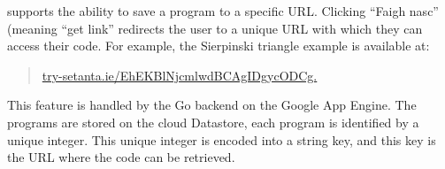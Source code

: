 \trys{} supports the ability to save a program to a specific URL. Clicking ``Faigh nasc'' (meaning ``get link'' redirects the user to a unique URL with which they can access their code. For example, the Sierpinski triangle example is available at:
\begin{quote}
    \href{https://try-setanta.ie/EhEKBlNjcmlwdBCAgIDgycODCg}{try-setanta.ie/EhEKBlNjcmlwdBCAgIDgycODCg.}
\end{quote}

This feature is handled by the Go backend on the Google App Engine. The programs are stored on the cloud Datastore, each program is identified by a unique integer. This unique integer is encoded into a string key, and this key is the URL where the code can be retrieved.
